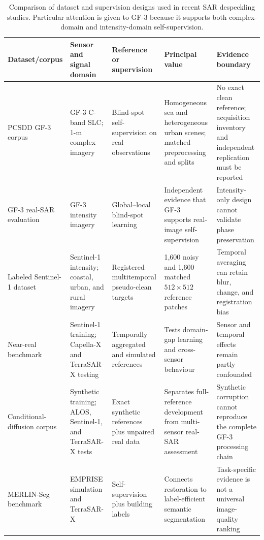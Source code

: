 \documentclass[11pt]{article}
\begin{document}
\begin{table}[t]
\centering
\caption{Comparison of dataset and supervision designs used in recent SAR despeckling studies. Particular attention is given to GF-3 because it supports both complex-domain and intensity-domain self-supervision.}
\label{tab:datasets}
\footnotesize
\setlength{\tabcolsep}{3.2pt}
\begin{tabularx}{\textwidth}{@{}L{0.19\textwidth}L{0.17\textwidth}L{0.21\textwidth}Y Y@{}}
\toprule
Dataset/corpus & Sensor and signal domain & Reference or supervision & Principal value & Evidence boundary \\
\midrule
PCSDD GF-3 corpus \cite{Xiong2026PCSDD} & GF-3 C-band SLC; 1-m complex imagery & Blind-spot self-supervision on real observations & Homogeneous sea and heterogeneous urban scenes; matched preprocessing and splits & No exact clean reference; acquisition inventory and independent replication must be reported \\
GF-3 real-SAR evaluation \cite{Yang2026GLCNet} & GF-3 intensity imagery & Global--local blind-spot learning & Independent evidence that GF-3 supports real-image self-supervision & Intensity-only design cannot validate phase preservation \\
Labeled Sentinel-1 dataset \cite{Vasquez2024Dataset} & Sentinel-1 intensity; coastal, urban, and rural imagery & Registered multitemporal pseudo-clean targets & 1,600 noisy and 1,600 matched $512\!\times\!512$ reference patches & Temporal averaging can retain blur, change, and registration bias \\
Near-real benchmark \cite{Guan2024NearReal,Fang2024Contrastive} & Sentinel-1 training; Capella-X and TerraSAR-X testing & Temporally aggregated and simulated references & Tests domain-gap learning and cross-sensor behaviour & Sensor and temporal effects remain partly confounded \\
Conditional-diffusion corpus \cite{Ma2024ConditionalDiffusion} & Synthetic training; ALOS, Sentinel-1, and TerraSAR-X tests & Exact synthetic references plus unpaired real data & Separates full-reference development from multi-sensor real-SAR assessment & Synthetic corruption cannot reproduce the complete GF-3 processing chain \\
MERLIN-Seg benchmark \cite{Dalsasso2024MERLINSeg} & EMPRISE simulation and TerraSAR-X & Self-supervision plus building labels & Connects restoration to label-efficient semantic segmentation & Task-specific evidence is not a universal image-quality ranking \\
\bottomrule
\end{tabularx}
\end{table}
\end{document}
